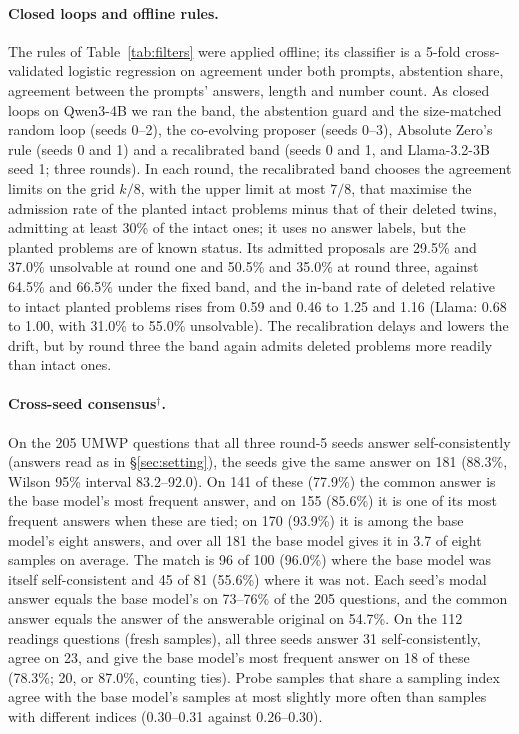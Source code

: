 \paragraph{Closed loops and offline rules.} The rules of Table~\ref{tab:filters} were applied offline; its classifier is a 5-fold cross-validated logistic regression on agreement under both prompts, abstention share, agreement between the prompts' answers, length and number count. As closed loops on Qwen3-4B we ran the band, the abstention guard and the size-matched random loop (seeds 0--2), the co-evolving proposer (seeds 0--3), Absolute Zero's rule (seeds 0 and 1) and a recalibrated band (seeds 0 and 1, and Llama-3.2-3B seed 1; three rounds). In each round, the recalibrated band chooses the agreement limits on the grid $k/8$, with the upper limit at most $7/8$, that maximise the admission rate of the planted intact problems minus that of their deleted twins, admitting at least 30\% of the intact ones; it uses no answer labels, but the planted problems are of known status. Its admitted proposals are 29.5\% and 37.0\% unsolvable at round one and 50.5\% and 35.0\% at round three, against 64.5\% and 66.5\% under the fixed band, and the in-band rate of deleted relative to intact planted problems rises from 0.59 and 0.46 to 1.25 and 1.16 (Llama: 0.68 to 1.00, with 31.0\% to 55.0\% unsolvable). The recalibration delays and lowers the drift, but by round three the band again admits deleted problems more readily than intact ones.

\paragraph{Cross-seed consensus$^{\dagger}$.} On the 205 UMWP questions that all three round-5 seeds answer self-consistently (answers read as in \S\ref{sec:setting}), the seeds give the same answer on 181 (88.3\%, Wilson 95\% interval 83.2--92.0). On 141 of these (77.9\%) the common answer is the base model's most frequent answer, and on 155 (85.6\%) it is one of its most frequent answers when these are tied; on 170 (93.9\%) it is among the base model's eight answers, and over all 181 the base model gives it in 3.7 of eight samples on average. The match is 96 of 100 (96.0\%) where the base model was itself self-consistent and 45 of 81 (55.6\%) where it was not. Each seed's modal answer equals the base model's on 73--76\% of the 205 questions, and the common answer equals the answer of the answerable original on 54.7\%. On the 112 readings questions (fresh samples), all three seeds answer 31 self-consistently, agree on 23, and give the base model's most frequent answer on 18 of these (78.3\%; 20, or 87.0\%, counting ties). Probe samples that share a sampling index agree with the base model's samples at most slightly more often than samples with different indices (0.30--0.31 against 0.26--0.30).

